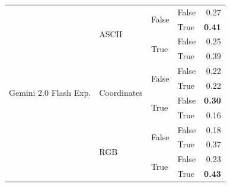 \documentclass{article}
\begin{document}
\begin{table}
\begin{center}
{\begin{tabular}{@{}llllr@{}}
    \midrule
    \multirow[c]{13}{*}{Gemini 2.0 Flash Exp.}  & \multirow[c]{4}{*}{ASCII}         & \multirow[c]{2}{*}{False} & False                     & 0.27 \\
                                                &                                   &                           & True                      & \textbf{0.41} \\
                                                &                                   & \multirow[c]{2}{*}{True}  & False                     & 0.25 \\
                                                &                                   &                           & True                      & 0.39 \\
    \cmidrule{2-5}
                                                & \multirow[c]{4}{*}{Coordinates}   & \multirow[c]{2}{*}{False} & False                     & 0.22 \\
                                                &                                   &                           & True                      & 0.22 \\
                                                &                                   & \multirow[c]{2}{*}{True}  & False                     & \textbf{0.30} \\
                                                &                                   &                           & True                      & 0.16 \\
    \cmidrule{2-5}
                                                & \multirow[c]{4}{*}{RGB}           & \multirow[c]{2}{*}{False} & False                     & 0.18 \\
                                                &                                   &                           & True                      & 0.37 \\
                                                &                                   & \multirow[c]{2}{*}{True}  & False                     & 0.23 \\
                                                &                                   &                           & True                      & \textbf{0.43} \\
   \bottomrule
\end{tabular}
}
    \end{center}
    \label{tab:grid-world-ablation-gemini}
\end{table}
\end{document}
